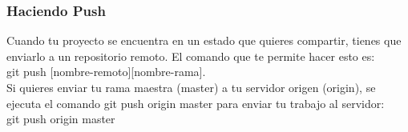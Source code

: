 \begin{frame}[fragile]
    \frametitle{Haciendo Push}
     Cuando tu proyecto se encuentra en un estado que quieres compartir,
     tienes que enviarlo a un repositorio remoto. El comando que te permite 
     hacer esto es:\\
     \alert{git push [nombre-remoto][nombre-rama]}. \\Si quieres
     enviar tu rama maestra (master) a tu servidor origen (origin), se 
     ejecuta el comando \alert{git push origin master} para enviar tu 
     trabajo al servidor: \\
     \alert{git push origin master}
\end{frame}
